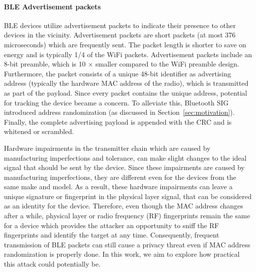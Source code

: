 \paragraph{BLE Advertisement packets} BLE devices utilize advertisement packets
to indicate their presence to other devices in the vicinity. Advertisement
packets are short packets (at most 376 microseconds) which are frequently sent.
The packet length is shorter to save on energy and is typically 1/4 of the WiFi
packets. Advertisement packets include an 8-bit preamble, which is 10 $\times$
smaller compared to the WiFi preamble design. Furthermore, the packet consists
of a unique 48-bit identifier as advertising address (typically the hardware
MAC address of the radio), which is transmitted as part of the payload. Since
every packet contains the unique address, potential for tracking the device
became a concern. To alleviate this, Bluetooth SIG introduced address
randomization (as discussed in Section~\ref{sec:motivation}). Finally, the
complete advertising payload is appended with the CRC and is whitened or
scrambled. 

Hardware impairments in the transmitter chain which are caused by manufacturing
imperfections and tolerance, can make slight changes to the ideal signal that
should be sent by the device. Since these impairments are caused by
manufacturing imperfections, they are different even for the devices from the
same make and model. As a result, these hardware impairments can leave a unique
signature or fingerprint in the physical layer signal, that can be considered as
an identity for the device. Therefore, even though the MAC address changes
after a while, physical layer or radio frequency (RF) fingerprints remain the
same for a device which provides the attacker an opportunity to sniff the RF
fingerprints and identify the target at any time. Consequently, frequent
transmission of BLE packets can still cause a privacy threat even if MAC address
randomization is properly done. In this work, we aim to explore how practical
this attack could potentially be.
\fi

\fi
